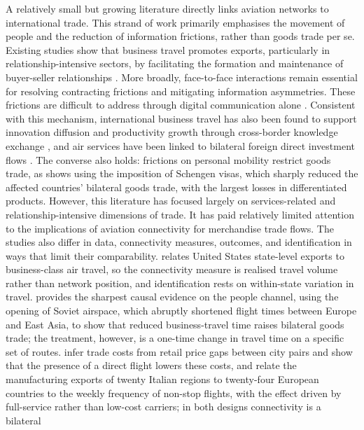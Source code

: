 A relatively small but growing literature directly links aviation networks to
international trade. This strand of work primarily emphasises the movement of
people and the reduction of information frictions, rather than goods trade
per se. Existing studies show that business travel promotes exports,
particularly in relationship-intensive sectors, by facilitating the formation
and maintenance of buyer-seller relationships
\citep{Cristea_2011,Belenkiy_2012}. More broadly, face-to-face interactions
remain essential for resolving contracting frictions and mitigating
information asymmetries. These frictions are difficult to address through
digital communication alone \citep{Rauch_1999,Allen_2014}. Consistent with
this mechanism, international business travel has also been found to support
innovation diffusion and productivity growth through cross-border knowledge
exchange \citep{Hovhannisyan_2015}, and air services have been linked to
bilateral foreign direct investment flows \citep{Fageda_2017}. The converse
also holds: frictions on personal mobility restrict goods trade, as
\citet{Umana_2019} shows using the imposition of Schengen visas, which
sharply reduced the affected countries' bilateral goods trade, with the
largest losses in differentiated products. However, this literature has focused
largely on services-related and relationship-intensive dimensions of trade.
It has paid relatively limited attention to the implications of aviation
connectivity for merchandise trade flows. The studies also differ in data,
connectivity measures, outcomes, and identification in ways that limit their
comparability. \citet{Cristea_2011} relates United States state-level exports
to business-class air travel, so the connectivity measure is realised travel
volume rather than network position, and identification rests on
within-state variation in travel. \citet{Soderlund_2023} provides the
sharpest causal evidence on the people channel, using the opening of Soviet
airspace, which abruptly shortened flight times between Europe and East
Asia, to show that reduced business-travel time raises bilateral goods
trade; the treatment, however, is a one-time change in travel time on a
specific set of routes. \citet{Yilmazkuday_2017} infer trade costs from retail price gaps between
city pairs and show that the presence of a direct flight lowers these
costs, and \citet{Alderighi_2017} relate the manufacturing exports of
twenty Italian regions to twenty-four European countries to the weekly
frequency of non-stop flights, with the effect driven by full-service
rather than low-cost carriers; in both designs connectivity is a bilateral
